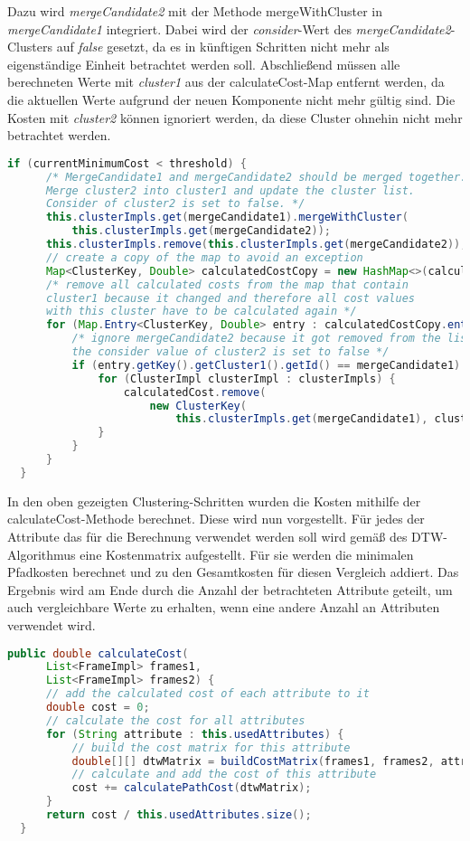 Dazu wird \emph{mergeCandidate2} mit der Methode mergeWithCluster in \emph{mergeCandidate1} integriert.
Dabei wird der \emph{consider}-Wert des \emph{mergeCandidate2}-Clusters auf \emph{false} gesetzt,
da es in künftigen Schritten nicht mehr als eigenständige Einheit betrachtet werden soll.
Abschließend müssen alle berechneten Werte mit \emph{cluster1} aus der calculateCost-Map entfernt werden,
da die aktuellen Werte aufgrund der neuen Komponente nicht mehr gültig sind.
Die Kosten mit \emph{cluster2} können ignoriert werden, da diese Cluster ohnehin nicht mehr betrachtet werden.
\begin{lstlisting}[language=Java, caption=Cluster-Methode: Mergevorgang.]
  if (currentMinimumCost < threshold) {
      /* MergeCandidate1 and mergeCandidate2 should be merged together.
      Merge cluster2 into cluster1 and update the cluster list.
      Consider of cluster2 is set to false. */
      this.clusterImpls.get(mergeCandidate1).mergeWithCluster(
          this.clusterImpls.get(mergeCandidate2));  
      this.clusterImpls.remove(this.clusterImpls.get(mergeCandidate2));
      // create a copy of the map to avoid an exception
      Map<ClusterKey, Double> calculatedCostCopy = new HashMap<>(calculatedCost); 
      /* remove all calculated costs from the map that contain
      cluster1 because it changed and therefore all cost values
      with this cluster have to be calculated again */
      for (Map.Entry<ClusterKey, Double> entry : calculatedCostCopy.entrySet()) {
          /* ignore mergeCandidate2 because it got removed from the list and
          the consider value of cluster2 is set to false */
          if (entry.getKey().getCluster1().getId() == mergeCandidate1) {
              for (ClusterImpl clusterImpl : clusterImpls) {
                  calculatedCost.remove(
                      new ClusterKey(
                          this.clusterImpls.get(mergeCandidate1), clusterImpl));
              }
          }
      }
  }
\end{lstlisting}
In den oben gezeigten Clustering-Schritten wurden die Kosten mithilfe der calculateCost-Methode berechnet.
Diese wird nun vorgestellt.
Für jedes der Attribute das für die Berechnung verwendet werden soll wird gemäß des \ac{DTW}-Algorithmus
eine Kostenmatrix aufgestellt.
Für sie werden die minimalen Pfadkosten berechnet und zu den Gesamtkosten für diesen Vergleich addiert.
Das Ergebnis wird am Ende durch die Anzahl der betrachteten Attribute geteilt,
um auch vergleichbare Werte zu erhalten, wenn eine andere Anzahl an Attributen verwendet wird.
\begin{lstlisting}[language=Java, caption=DTW: Berechnung der Kosten.]
  public double calculateCost(
      List<FrameImpl> frames1,
      List<FrameImpl> frames2) {
      // add the calculated cost of each attribute to it
      double cost = 0;
      // calculate the cost for all attributes
      for (String attribute : this.usedAttributes) {
          // build the cost matrix for this attribute
          double[][] dtwMatrix = buildCostMatrix(frames1, frames2, attribute);
          // calculate and add the cost of this attribute
          cost += calculatePathCost(dtwMatrix);
      }
      return cost / this.usedAttributes.size();
  }
\end{lstlisting}
